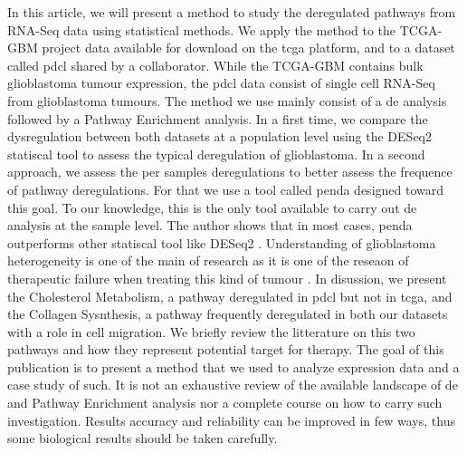 In this article, we will present a method to study the deregulated pathways from RNA-Seq data using statistical methods.
We apply the method to the TCGA-GBM project data available for download on the \acrfull{tcga} platform, and to a dataset called \acrfull{pdcl} shared by a collaborator.
While the TCGA-GBM contains bulk glioblastoma tumour expression, the \acrshort{pdcl} data consist of single cell RNA-Seq from glioblastoma tumours.
The method we use mainly consist of a \acrfull{de} analysis followed by a Pathway Enrichment analysis.
In a first time, we compare the dysregulation between both datasets at a population level using the DESeq2 statiscal tool to assess the typical deregulation of glioblastoma.
In a second approach, we assess the per samples deregulations to better assess the frequence of pathway deregulations. For that we use a tool called \acrfull{penda} designed toward this goal.
To our knowledge, this is the only tool available to carry out \acrlong{de} analysis at the sample level.
The author shows that in most cases, \acrshort{penda} outperforms other statiscal tool like DESeq2 \cite*{Richard2020}.
Understanding of glioblastoma heterogeneity is one of the main of research as it is one of the reseaon of therapeutic failure when treating this kind of tumour \cite*{Neftel2019}.
In disussion, we present the Cholesterol Metabolism, a pathway deregulated in \acrshort{pdcl} but not in \acrshort{tcga}, and the Collagen Sysnthesis, a pathway frequently deregulated in both our datasets with a role in cell migration.
We briefly review the litterature on this two pathways and how they represent potential target for therapy.
The goal of this publication is to present a method that we used to analyze expression data and a case study of such.
It is not an exhaustive review of the available landscape of \acrlong{de} and Pathway Enrichment analysis nor a complete course on how to carry such investigation.
Results accuracy and reliability can be improved in few ways, thus some biological results should be taken carefully.